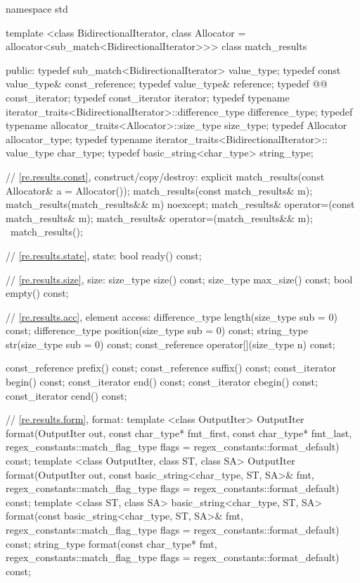 \begin{codeblock}
namespace std {
  template <class BidirectionalIterator,
            class Allocator = allocator<sub_match<BidirectionalIterator>>>
  class match_results {
  public: 
     typedef sub_match<BidirectionalIterator>                       value_type;
     typedef const value_type&                                      const_reference;
     typedef value_type&                                            reference;
     typedef @{\impdef}@                                 const_iterator;
     typedef const_iterator                                         iterator;
     typedef typename
      iterator_traits<BidirectionalIterator>::difference_type       difference_type;
     typedef typename allocator_traits<Allocator>::size_type        size_type;
     typedef Allocator                                              allocator_type;
     typedef typename iterator_traits<BidirectionalIterator>::
       value_type                                                   char_type;
     typedef basic_string<char_type>                                string_type;

     // \ref{re.results.const}, construct/copy/destroy:
     explicit match_results(const Allocator& a = Allocator());
     match_results(const match_results& m);
     match_results(match_results&& m) noexcept;
     match_results& operator=(const match_results& m); 
     match_results& operator=(match_results&& m);
     ~match_results();

     // \ref{re.results.state}, state:
     bool ready() const;

     // \ref{re.results.size}, size:
     size_type size() const;
     size_type max_size() const;
     bool empty() const;

     // \ref{re.results.acc}, element access:
     difference_type length(size_type sub = 0) const;
     difference_type position(size_type sub = 0) const;
     string_type str(size_type sub = 0) const;
     const_reference operator[](size_type n) const;

     const_reference prefix() const;
     const_reference suffix() const;
     const_iterator begin() const;
     const_iterator end() const;
     const_iterator cbegin() const;
     const_iterator cend() const;

     // \ref{re.results.form}, format:
     template <class OutputIter>
      OutputIter
      format(OutputIter out,
             const char_type* fmt_first, const char_type* fmt_last,
             regex_constants::match_flag_type flags =
              regex_constants::format_default) const;
     template <class OutputIter, class ST, class SA>
       OutputIter
       format(OutputIter out,
              const basic_string<char_type, ST, SA>& fmt,
              regex_constants::match_flag_type flags =
                regex_constants::format_default) const;
     template <class ST, class SA>
      basic_string<char_type, ST, SA>
      format(const basic_string<char_type, ST, SA>& fmt,
             regex_constants::match_flag_type flags =
               regex_constants::format_default) const;
     string_type
     format(const char_type* fmt,
            regex_constants::match_flag_type flags =
              regex_constants::format_default) const;

}}
\end{codeblock}
